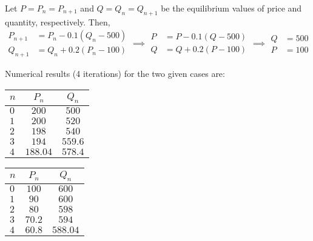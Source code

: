 \documentclass[11pt]{penrose}
\begin{document}
\begin{problem}{2}
    Let $P = P_{n} = P_{n+1}$ and $Q = Q_{n} = Q_{n+1}$ be the equilibrium values of price and quantity, respectively. Then,
    \begin{equation*}
        \begin{aligned}
            P_{n+1} &= P_{n} - 0.1(Q_{n} - 500)\\
            Q_{n+1} &= Q_{n} + 0.2(P_{n} - 100)
        \end{aligned}
        \implies
        \begin{aligned}
            P &= P - 0.1(Q - 500)\\
            Q &= Q + 0.2(P - 100)
        \end{aligned}
        \implies
        \begin{aligned}
            Q &= 500 \\ P &= 100
        \end{aligned}
    \end{equation*}

    Numerical results (4 iterations) for the two given cases are:

    \begin{tabularx}{0.42\textwidth}{D{10mm}CC}
        \toprule
        $n$ & $P_{n}$ & $Q_{n}$ \\
        \midrule
        $0$ & $200$ & $500$ \\
        $1$ & $200$ & $520$ \\
        $2$ & $198$ & $540$ \\
        $3$ & $194$ & $559.6$ \\
        $4$ & $188.04$ & $578.4$ \\
        \bottomrule
    \end{tabularx}
    \hfill
    \begin{tabularx}{0.42\textwidth}{D{10mm}CC}
        \toprule
        $n$ & $P_{n}$ & $Q_{n}$ \\
        \midrule
        $0$ & $100$ & $600$ \\
        $1$ & $90$ & $600$ \\
        $2$ & $80$ & $598$ \\
        $3$ & $70.2$ & $594$ \\
        $4$ & $60.8$ & $588.04$ \\
        \bottomrule
    \end{tabularx}
\end{problem}
\end{document}
